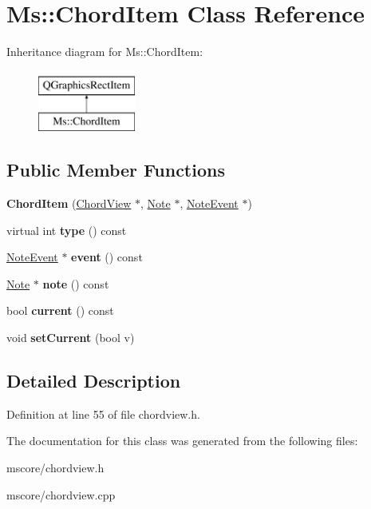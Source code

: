 \hypertarget{class_ms_1_1_chord_item}{}\section{Ms\+:\+:Chord\+Item Class Reference}
\label{class_ms_1_1_chord_item}
Inheritance diagram for Ms\+:\+:Chord\+Item\+:\begin{figure}[H]
\begin{center}
\leavevmode
\includegraphics[height=2.000000cm]{class_ms_1_1_chord_item}
\end{center}
\end{figure}
\subsection*{Public Member Functions}
\begin{DoxyCompactItemize}
\item 
\mbox{\label{class_ms_1_1_chord_item_a8303a6dd14fb1e30e6aa6249b0c0d704}} 
{\bfseries Chord\+Item} (\hyperlink{class_ms_1_1_chord_view}{Chord\+View} $\ast$, \hyperlink{class_ms_1_1_note}{Note} $\ast$, \hyperlink{class_ms_1_1_note_event}{Note\+Event} $\ast$)
\item 
\mbox{\label{class_ms_1_1_chord_item_a7b70939e501f0ae1b725f27e012f7f88}} 
virtual int {\bfseries type} () const
\item 
\mbox{\label{class_ms_1_1_chord_item_a01aa7faf8bd4baa65d07749a604a01a4}} 
\hyperlink{class_ms_1_1_note_event}{Note\+Event} $\ast$ {\bfseries event} () const
\item 
\mbox{\label{class_ms_1_1_chord_item_a2d5d00c1c67e320af82dbc92db588cf6}} 
\hyperlink{class_ms_1_1_note}{Note} $\ast$ {\bfseries note} () const
\item 
\mbox{\label{class_ms_1_1_chord_item_a87fb625976ca489e591055f02e9dfd61}} 
bool {\bfseries current} () const
\item 
\mbox{\label{class_ms_1_1_chord_item_af6f7a8e9a6cf7ac3c2691bebfaaee9fc}} 
void {\bfseries set\+Current} (bool v)
\end{DoxyCompactItemize}


\subsection{Detailed Description}


Definition at line 55 of file chordview.\+h.



The documentation for this class was generated from the following files\+:\begin{DoxyCompactItemize}
\item 
mscore/chordview.\+h\item 
mscore/chordview.\+cpp\end{DoxyCompactItemize}
